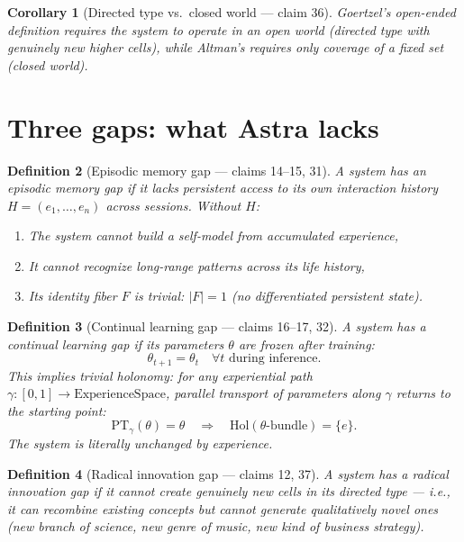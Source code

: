 \documentclass[11pt,a4paper]{article}
\newtheorem{definition}{Definition}[section]
\newtheorem{corollary}[definition]{Corollary}
\begin{document}
\begin{corollary}[Directed type vs.\ closed world --- claim 36]
Goertzel's open-ended definition requires the system to operate in an
\emph{open world} (directed type with genuinely new higher cells),
while Altman's requires only coverage of a fixed set (closed world).
\end{corollary}

\section{Three gaps: what Astra lacks}
\label{sec:gaps}

\begin{definition}[Episodic memory gap --- claims 14--15, 31]
\label{def:episodic-gap}
A system has an \emph{episodic memory gap} if it lacks persistent access
to its own interaction history $H = (e_1, \ldots, e_n)$ across sessions.
Without $H$:
\begin{enumerate}
\item The system cannot build a self-model from accumulated experience,
\item It cannot recognize long-range patterns across its life history,
\item Its identity fiber $F$ is trivial: $|F| = 1$ (no differentiated
  persistent state).
\end{enumerate}
\end{definition}

\begin{definition}[Continual learning gap --- claims 16--17, 32]
\label{def:continual-gap}
A system has a \emph{continual learning gap} if its parameters
$\theta$ are frozen after training:
\[
  \theta_{t+1} = \theta_t \quad \forall t \text{ during inference}.
\]
This implies \emph{trivial holonomy}: for any experiential path
$\gamma : [0,1] \to \text{ExperienceSpace}$, parallel transport of
parameters along $\gamma$ returns to the starting point:
\[
  \text{PT}_\gamma(\theta) = \theta
  \quad \Rightarrow \quad
  \text{Hol}(\theta\text{-bundle}) = \{e\}.
\]
The system is literally unchanged by experience.
\end{definition}

\begin{definition}[Radical innovation gap --- claims 12, 37]
\label{def:innovation-gap}
A system has a \emph{radical innovation gap} if it cannot create genuinely
new cells in its directed type --- i.e., it can recombine existing concepts
but cannot generate qualitatively novel ones (new branch of science, new
genre of music, new kind of business strategy).
\end{definition}
\end{document}
